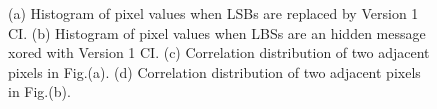 \begin{figure}
{}
\caption{ (a) Histogram of pixel values when LSBs are replaced by Version 1 CI. (b) Histogram of pixel values when LBSs are an hidden message xored with Version 1 CI. (c) Correlation distribution of two adjacent pixels in Fig.(a). (d) Correlation distribution of two adjacent pixels in Fig.(b).  }
\label{Old_CI_hiding}
\end{figure}
